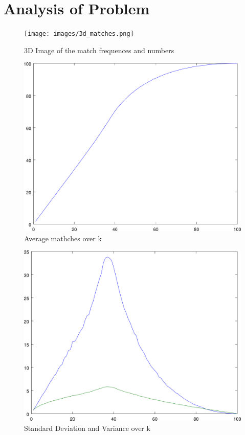 \documentclass{article}
\begin{document}
   \section{Analysis of Problem}
      \begin{figure}[H]
         \texttt{[image: images/3d\_matches.png]}
         \caption{3D Image of the match frequences and numbers}
      \end{figure}
      \begin{figure}[H]
         \includegraphics[width=\textheight/2]{images/mean.png}
         \caption{Average mathches over k}
      \end{figure}
      \begin{figure}[H]
         \includegraphics[width=\textheight/2]{images/dev_var.png}
         \caption{Standard Deviation and Variance over k}
      \end{figure}
\end{document}
